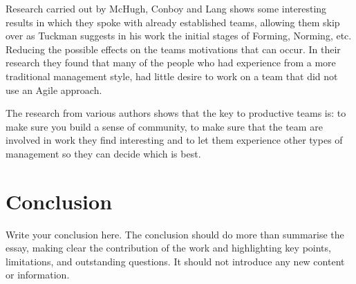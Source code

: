 \documentclass{scrartcl}
\begin{document}
Research carried out by McHugh, Conboy and Lang \cite {AgilePractices} shows some interesting results in which they spoke with already established teams, allowing them skip over as Tuckman \cite {Tuckman} suggests in his work the initial stages of Forming, Norming, etc. Reducing the possible effects on the teams motivations that can occur. In their research they found that many of the people who had experience from a more traditional management style, had little desire to work on a team that did not use an Agile approach.
 
The research from various authors shows that the key to productive teams is: to make sure you build a sense of community, to make sure that the team are involved in work they find interesting and to let them experience other types of management so they can decide which is best.

\section{}




\section{Conclusion}

Write your conclusion here. The conclusion should do more than summarise the essay, making clear the contribution of the work and highlighting key points, limitations, and outstanding questions. It should not introduce any new content or information.



\end{document}
